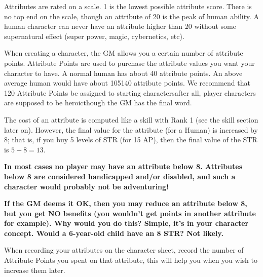 \documentclass[twoside]{book}
\begin{document}
    {  
    Attributes are rated on a scale. 1 is the lowest
               possible attribute score. There is no top end on the
               scale, though an attribute of 20 is the peak of human
               ability. A human character can never have an attribute
               higher than 20 without some supernatural effect (super
               power, magic, cybernetics, etc). 
    }
  
    {  
    When creating a character, the GM allows you a
               certain number of attribute points. Attribute Points are
               used to purchase the attribute values you want your
               character to have. A normal human has about 40 attribute
               points. An above average human would have about
               105140 attribute points. We recommend that 120
               Attribute Points be assigned to starting
               charactersafter all, player characters are supposed
               to be heroicthough the GM has the final word.
               
    }
  
    {  
    The cost of an attribute is computed like a skill
              with Rank 1 (see the skill section later on). However, the
              final value for the attribute (for a Human) is increased by
              8; that is, if you buy 5 levels of STR (for 15 AP), then
              the final value of the STR is \begin{math} 5  +
               8  =    13 \end{math}.
            
    }
  

 \textbf{ In most cases no player may have an attribute below
               8. Attributes below 8 are considered handicapped and/or
               disabled, and such a character would probably not be
               adventuring! }



 \textbf{ If the GM deems it OK, then you may reduce an
               attribute below 8, but you get NO benefits (you
               wouldn't get points in another attribute for
               example). Why would you do this? Simple, it's in
               your character concept. Would a 6-year-old child have an 8
               STR? Not likely. }


    {  
    When recording your attributes on the character
               sheet, record the number of Attribute Points you spent on
               that attribute, this will help you when you wish to
               increase them later. 
    }
  
\end{document}
